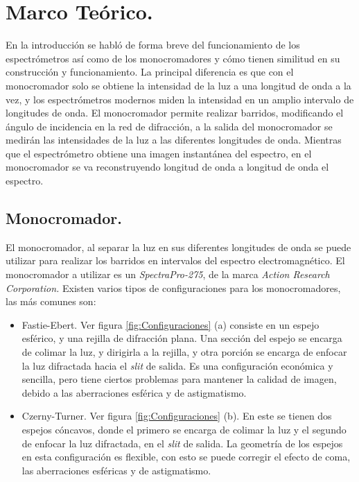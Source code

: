 \chapter{Marco Teórico.}
En la introducción se habló de forma breve del funcionamiento de los espectrómetros así como de los monocromadores y cómo tienen similitud en su construcción y funcionamiento. La principal diferencia es que con el monocromador solo se obtiene la intensidad de la luz a una longitud de onda a la vez, y los espectrómetros modernos miden la intensidad en un amplio intervalo de longitudes de onda. El monocromador permite realizar barridos, modificando el ángulo de incidencia en la red de difracción, a la salida del monocromador se medirán las intensidades de la luz a las diferentes longitudes de onda. Mientras que el espectrómetro obtiene una imagen instantánea del espectro, en el monocromador se va reconstruyendo longitud de onda a longitud de onda el espectro.

\section{Monocromador.}
El monocromador, al separar la luz en sus diferentes longitudes de onda se puede utilizar para realizar los barridos en intervalos del espectro electromagnético. 
El monocromador a utilizar es un \textit{SpectraPro-275}, de la marca \textit{Action Research Corporation.}
Existen varios tipos de configuraciones para los monocromadores, las más comunes son:

\begin{itemize}
	\item Fastie-Ebert. Ver figura \ref{fig:Configuraciones} (a) consiste en un espejo esférico, y una rejilla de difracción plana. Una sección del espejo se encarga de colimar la luz, y dirigirla a la rejilla, y otra porción se encarga de enfocar la luz difractada hacia el \textit{slit} de salida.
	Es una configuración económica y sencilla, pero tiene ciertos problemas para mantener la calidad de imagen, debido a las aberraciones esférica y de astigmatismo.
	\item  Czerny-Turner. Ver figura \ref{fig:Configuraciones} (b). En este se tienen dos espejos cóncavos, donde el primero se encarga de colimar la luz y el segundo de enfocar la luz difractada, en el \textit{slit} de salida. La geometría de los espejos en esta configuración es flexible, con esto se puede corregir el efecto de coma, las aberraciones esféricas y de astigmatismo. 
\end{itemize} 


